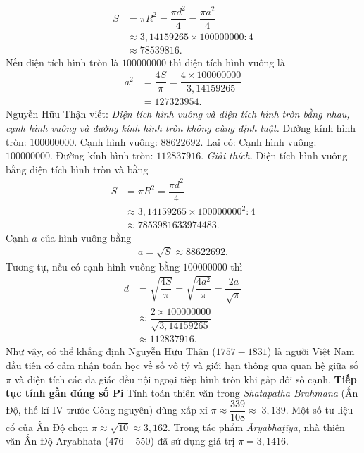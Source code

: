 \begin{multicols}{2}
	\setlength{\abovedisplayskip}{7pt}
	\setlength{\belowdisplayskip}{7pt}
	\begin{align*}
			S &= \pi {R^2} = \dfrac{{\pi {d^2}}}{4} = \dfrac{{\pi {a^2}}}{4}\\
			&\approx 3{,}14159265 \times 100000000:4 \\
			&\approx 78539816.	
	\end{align*}
	Nếu diện tích hình tròn là $100000000$ thì diện tích hình vuông là
	\begin{align*}
		{a^2} &= \dfrac{{4S}}{\pi } = \dfrac{{4 \times 100000000}}{{3{,}14159265}}\\ &= 127323954.
	\end{align*}
	Nguyễn Hữu Thận viết:  \textit{Diện tích hình vuông và diện tích hình tròn bằng nhau, cạnh hình vuông và đường kính hình tròn không cùng định luật.}
	\vskip 0.1cm
	Đường kính hình tròn: $100000000$.
	\vskip 0.1cm 
	Cạnh hình vuông: $88622692$.
	\vskip 0.1cm
	Lại có: 
	\vskip 0.1cm
	Cạnh hình vuông: $100000000$.
	\vskip 0.1cm 
	Đường kính hình tròn: $112837916$.
	\vskip 0.1cm
	\textit{Giải thích}. Diện tích hình vuông bằng diện tích hình tròn và bằng 
	\begin{align*}
		S &= \pi {R^2} = \dfrac{{\pi {d^2}}}{4}\\
		&\approx 3{,}14159265 \times {100000000^2}:4 \\
		&\approx 7853981633974483.
	\end{align*}
	Cạnh $a$ của hình vuông bằng
	\begin{align*}
		a = \sqrt S  \approx 88622692.
	\end{align*}
	Tương tự, nếu có cạnh hình vuông bằng $100000000$ thì  
	\begin{align*}
		d &= \sqrt {\dfrac{{4S}}{\pi }}  = \sqrt {\dfrac{{4{a^2}}}{\pi }}  = \dfrac{{2a}}{{\sqrt \pi  }} \\
		&\approx \dfrac{{2 \times 100000000}}{{\sqrt {3{,}14159265} }} \\
		&\approx 112837916.
	\end{align*}
	Như vậy, có thể khẳng định Nguyễn Hữu Thận ($1757-1831$) là người Việt Nam đầu tiên có cảm nhận toán học về số vô tỷ và giới hạn thông qua quan hệ giữa số $\pi$ và diện tích các đa giác đều nội ngoại tiếp hình tròn khi gấp đôi số cạnh.
	\vskip 0.1cm
	\textbf{\color{lichsutoanhoc}Tiếp tục tính gần đúng số Pi}
	\vskip 0.1cm
	Tính toán thiên văn trong \textit{Shatapatha Brahmana} (Ấn Độ, thế kỉ IV trước Công nguyên) dùng xấp xỉ $\pi  \approx \dfrac{{339}}{{108}} \approx \;3{,}139$.  Một số tư liệu cổ của Ấn Độ chọn $\pi  \approx \sqrt {10}  \approx 3{,}162$. Trong tác phẩm \textit{Āryabhaṭīya}, nhà thiên văn Ấn Độ Aryabhata ($476-550$) đã sử dụng giá trị $\pi  = 3{,}1416$.

\end{multicols}
